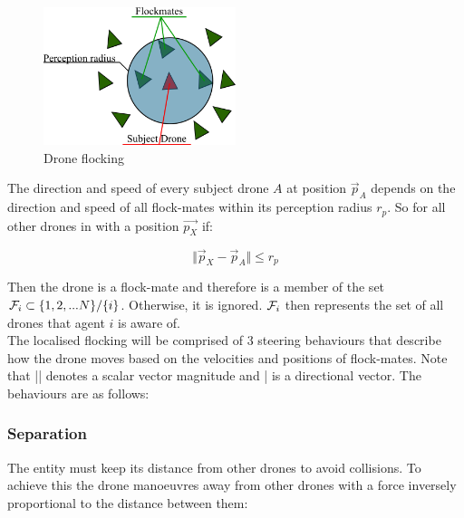 \begin{figure}[h]
    \centering
    \includegraphics[width=0.5\textwidth]{figures/Flocking.png}
    \vspace{0.2cm}
    \caption{Drone flocking}
    \label{fig:Flocking}
\end{figure}

The direction and speed of every subject drone \(A\) at position \(\vec{p}_{A}\) depends on the direction and speed of all flock-mates within its perception radius \(r_p\). So for all other drones in with a position \(\vec{p_X}\) if:

\begin{equation}
    \Vert\vec{p}_{X}-\vec{p}_{A}\Vert\leq r_{p}
    \label{equ:per}
\end{equation}



\noindent


Then the drone is a flock-mate and therefore is a member of the set ${\cal{F}}_i \subset\{1,2,...N\}/\{i\}$. Otherwise, it is ignored. ${\cal{F}}_i$ then represents the set of all drones that agent $i$ is aware of.\hfill\\
\clearpage
\noindent
The localised flocking will be comprised of 3 steering behaviours that describe how the drone moves based on the velocities and positions of flock-mates. Note that || denotes a scalar vector magnitude and | is a directional vector. The behaviours are as follows:

\subsubsection{Separation}
The entity must keep its distance from other drones to avoid collisions. To achieve this the drone manoeuvres away from other drones with a force inversely proportional to the distance between them:

